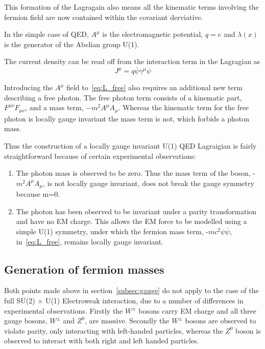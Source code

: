 This formation of the Lagragain also means all the kinematic terms involving the fermion field are now contained within the covariant derviative.

In the simple case of QED, $A^{\mu}$ is the electromagnetic potential, $q = e$ and $\lambda(x)$ is the generator of the Abelian group U(1).

The current density can be read off from the interaction term in the Lagragian as
\begin{equation}
  J^{\mu} = q\overline{\psi}\gamma^{\mu}\psi
\end{equation}

Introducing the $A^{\mu}$ field to~\autoref{eq:L_free} also requires an additional new term describing a free photon. The free photon term consists of a kinematic part, $F^{\mu\nu}F_{\mu\nu}$, and a mass term, $-m^{2}A^{\mu}A_{\mu}$. Whereas the kinematic term for the free photon is locally gauge invariant the mass term is not, which forbids a photon mass.

Thus the construction of a locally gauge invariant U(1) QED Lagraigian is fairly straightforward because of certain experimental observations:
\begin{enumerate}
\item
  The photon mass is observed to be zero. Thus the mass term of the boson, -$m^{2}A^{\mu}A_{\mu}$, is not locally gauge invariant, does not break the gauge symmetry because m=0.
\item
  The photon has been observed to be invariant under a parity transformation and have no EM charge. This allows the EM force to be modelled using a  simple U(1) symmetry, under which the fermion mass term, -$mc^{2}\psi\overline{\psi}$, in~\autoref{eq:L_free}, remains locally gauge invariant.

\end{enumerate}
\subsection{Generation of fermion masses}
Both points made above in section~\ref{subsec:gauge} do not apply to the case of the full SU(2) $\times$ U(1) Electroweak interaction, due to a number of differences in experimental observations. Firstly the $W^{\pm}$ bosons carry EM charge and all three gauge bosons, $W^{\pm}$ and $Z^{0}$, are massive. Secondly the $W^{\pm}$ bosons are observed to violate parity, only interacting with left-handed particles, whereas the $Z^{0}$ boson is observed to interact with both right and left handed particles. 

